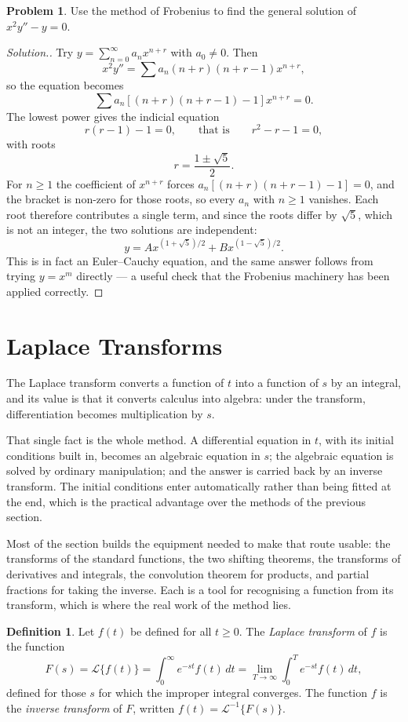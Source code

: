 \documentclass[11pt,a4paper]{article}
\theoremstyle{definition}
\newtheorem{defn}[thm]{Definition}
\newtheorem{problemx}{Problem}[subsection]
\newenvironment{problem}{\begin{problemx}}{\end{problemx}}
\newenvironment{solution}
  {\renewcommand{\qedsymbol}{}\begin{proof}[\textit{Solution}.]}
  {\end{proof}}
\begin{document}
\begin{problem}
Use the method of Frobenius to find the general solution of
$x^2y''-y = 0$.
\end{problem}
\begin{solution}
Try $y = \displaystyle\sum_{n=0}^{\infty}a_nx^{n+r}$ with $a_0\neq 0$. Then
\[x^2y'' = \sum a_n(n+r)(n+r-1)x^{n+r},\]
so the equation becomes
\[\sum a_n[(n+r)(n+r-1) - 1]x^{n+r} = 0 .\]
The lowest power gives the indicial equation
\[r(r-1)-1 = 0,\qquad\text{that is}\qquad r^2-r-1 = 0 ,\]
with roots
\[r = \frac{1\pm\sqrt5}{2}.\]
For $n\geq 1$ the coefficient of $x^{n+r}$ forces
$a_n[(n+r)(n+r-1)-1] = 0$, and the bracket is non-zero for those roots,
so every $a_n$ with $n\geq 1$ vanishes. Each root therefore contributes a single
term, and since the roots differ by $\sqrt5$, which is not an integer, the two
solutions are independent:
\[y = Ax^{(1+\sqrt5)/2} + Bx^{(1-\sqrt5)/2}.\]
This is in fact an Euler--Cauchy equation, and the same answer follows from
trying $y = x^m$ directly --- a useful check that the Frobenius machinery has
been applied correctly.
\end{solution}


{\color[wave]{485} \section{Laplace Transforms}}

The Laplace transform converts a function of $t$ into a function of $s$ by an
integral, and its value is that it converts calculus into algebra: under the
transform, differentiation becomes multiplication by $s$.

That single fact is the whole method. A differential equation in $t$, with its
initial conditions built in, becomes an algebraic equation in $s$; the algebraic
equation is solved by ordinary manipulation; and the answer is carried back by
an inverse transform. The initial conditions enter automatically rather than
being fitted at the end, which is the practical advantage over the methods of
the previous section.

Most of the section builds the equipment needed to make that route usable: the
transforms of the standard functions, the two shifting theorems, the transforms
of derivatives and integrals, the convolution theorem for products, and partial
fractions for taking the inverse. Each is a tool for recognising a function from
its transform, which is where the real work of the method lies.

\begin{defn}
\label{defn:laplace}
Let $f(t)$ be defined for all $t\geq 0$. The \emph{Laplace transform} of $f$ is
the function
\[F(s) = \mathcal{L}\{f(t)\} = \int_0^{\infty}e^{-st}f(t)\,dt
= \lim_{T\to\infty}\int_0^T e^{-st}f(t)\,dt ,\]
defined for those $s$ for which the improper integral converges. The function
$f$ is the \emph{inverse transform} of $F$, written
$f(t) = \mathcal{L}^{-1}\{F(s)\}$.
\end{defn}
\end{document}
